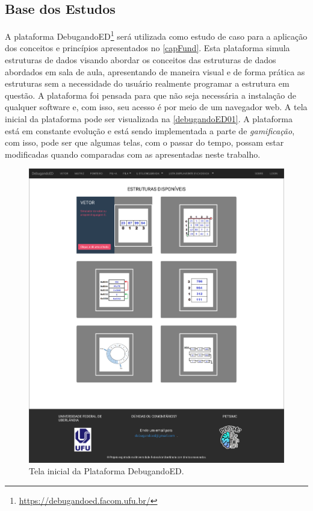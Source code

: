 \subsection{Base dos Estudos}

A plataforma DebugandoED\footnote{\url{https://debugandoed.facom.ufu.br/}} será utilizada como estudo de caso para a aplicação dos conceitos e princípios apresentados no \autoref{capFund}. Esta plataforma simula estruturas de dados visando abordar os conceitos das estruturas de dados abordados em sala de aula, apresentando de maneira visual e de forma prática as estruturas sem a necessidade do usuário realmente programar a estrutura em questão. A plataforma foi pensada para que não seja necessária a instalação de qualquer software e, com isso, seu acesso é por meio de um navegador web. A tela inicial da plataforma pode ser visualizada na \autoref{debugandoED01}. A plataforma está em constante evolução e está sendo implementada a parte de \textit{gamificação}, com isso, pode ser que algumas telas, com o passar do tempo, possam estar modificadas quando comparadas com as apresentadas neste trabalho.

\begin{figure}[ht]
    \begin{center}
        \includegraphics[scale=0.3]{figs/debugandoED01.png}
    \end{center}
    \caption{\label{debugandoED01}Tela inicial da Plataforma DebugandoED.}
\end{figure}


